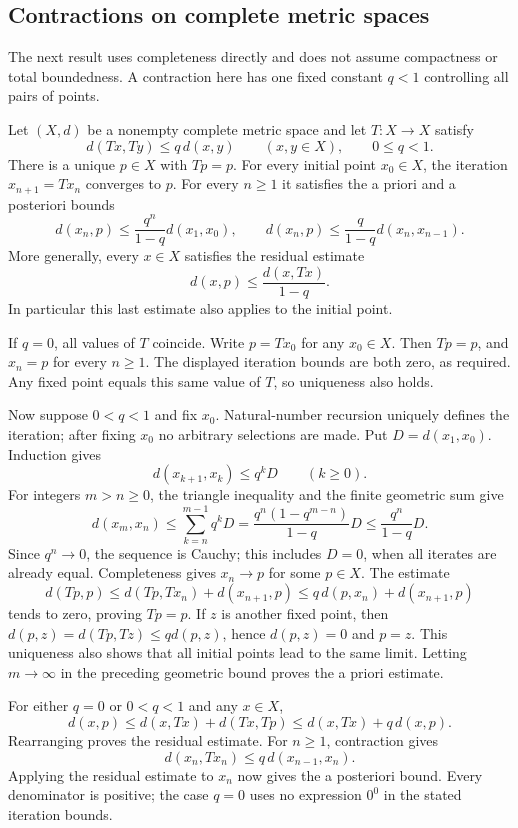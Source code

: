 \subsection{Contractions on complete metric spaces}
The next result uses completeness directly and does not assume
compactness or total boundedness. A contraction here has one fixed
constant $q<1$ controlling all pairs of points.

\begin{theorem}
\label{thm:banach_contraction}
Let $(X,d)$ be a nonempty complete metric space and let $T:X\to X$
satisfy
\[
d(Tx,Ty)\leq q\,d(x,y)\qquad(x,y\in X),\qquad 0\leq q<1.
\]
There is a unique $p\in X$ with $Tp=p$. For every initial point
$x_0\in X$, the iteration $x_{n+1}=Tx_n$ converges to $p$.
For every $n\geq1$ it satisfies the a priori and a posteriori bounds
\[
d(x_n,p)\leq\frac{q^n}{1-q}d(x_1,x_0),\qquad
d(x_n,p)\leq\frac{q}{1-q}d(x_n,x_{n-1}).
\]
More generally, every $x\in X$ satisfies the residual estimate
\[
d(x,p)\leq\frac{d(x,Tx)}{1-q}.
\]
In particular this last estimate also applies to the initial point.
\end{theorem}
\Proof
If $q=0$, all values of $T$ coincide. Write $p=Tx_0$ for any
$x_0\in X$. Then $Tp=p$, and $x_n=p$ for every $n\geq1$.
The displayed iteration bounds are both zero, as required. Any fixed
point equals this same value of $T$, so uniqueness also holds.

Now suppose $0<q<1$ and fix $x_0$. Natural-number recursion uniquely
defines the iteration; after fixing $x_0$ no arbitrary selections are
made. Put $D=d(x_1,x_0)$. Induction gives
\[
d(x_{k+1},x_k)\leq q^kD\qquad(k\geq0).
\]
For integers $m>n\geq0$, the triangle inequality and the finite
geometric sum give
\[
d(x_m,x_n)\leq\sum_{k=n}^{m-1}q^kD
=\frac{q^n(1-q^{m-n})}{1-q}D
\leq\frac{q^n}{1-q}D.
\]
Since $q^n\to0$, the sequence is Cauchy; this includes $D=0$,
when all iterates are already equal. Completeness gives $x_n\to p$
for some $p\in X$. The estimate
\[
d(Tp,p)\leq d(Tp,Tx_n)+d(x_{n+1},p)
\leq q\,d(p,x_n)+d(x_{n+1},p)
\]
tends to zero, proving $Tp=p$. If $z$ is another fixed point, then
$d(p,z)=d(Tp,Tz)\leq qd(p,z)$, hence $d(p,z)=0$ and $p=z$.
This uniqueness also shows that all initial points lead to the same
limit. Letting $m\to\infty$ in the preceding geometric bound proves
the a priori estimate.

For either $q=0$ or $0<q<1$ and any $x\in X$,
\[
d(x,p)\leq d(x,Tx)+d(Tx,Tp)
\leq d(x,Tx)+q\,d(x,p).
\]
Rearranging proves the residual estimate. For $n\geq1$, contraction gives
\[
d(x_n,Tx_n)\leq q\,d(x_{n-1},x_n).
\]
Applying the residual estimate to $x_n$ now gives the a posteriori bound.
Every denominator is positive; the
case $q=0$ uses no expression $0^0$ in the stated iteration bounds.
\Done

